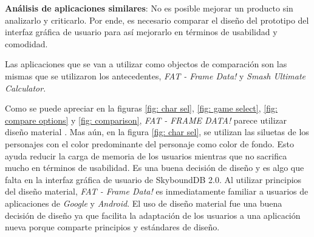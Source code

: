 \textbf{Análisis de aplicaciones similares}: No es posible mejorar un producto sin analizarlo y criticarlo. Por ende, es necesario comparar el diseño del prototipo del interfaz gráfica de usuario para así mejorarlo en términos de usabilidad y comodidad.

Las aplicaciones que se van a utilizar como objectos de comparación son las mismas que se utilizaron los antecedentes, \textit{FAT - Frame Data!} y \textit{Smash Ultimate Calculator}.

Como se puede apreciar en la figuras \ref{fig: char sel}, \ref{fig: game select}, \ref{fig: compare options} y \ref{fig: comparison}, \textit{FAT - FRAME DATA!} parece utilizar diseño material \cite{noauthor_designing_nodate}. Mas aún, en la figura \ref{fig: char sel}, se utilizan las siluetas de los personajes con el color predominante del personaje como color de fondo. Esto ayuda reducir la carga de memoria de los usuarios mientras que no sacrifica mucho en términos de usabilidad. Es una buena decisión de diseño y es algo que falta en la interfaz gráfica de usuario de SkyboundDB 2.0. Al utilizar principios del diseño material, \textit{FAT - Frame Data!} es inmediatamente familiar a usuarios de aplicaciones de \textit{Google} y \textit{Android}. El uso de diseño material fue una buena decisión de diseño ya que facilita la adaptación de los usuarios a una aplicación nueva porque comparte principios y estándares de diseño.

